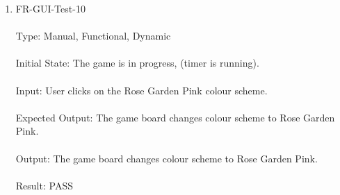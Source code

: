 \documentclass[12pt, titlepage]{article}
\begin{document}
\begin{enumerate}
\item{FR-GUI-Test-10\\\\}
Type: Manual, Functional, Dynamic\\\\				
Initial State: The game is in progress, (timer is running).\\\\
Input: User clicks on the Rose Garden Pink colour scheme.\\\\
Expected Output: The game board changes colour scheme to Rose Garden Pink.\\\\
Output: The game board changes colour scheme to Rose Garden Pink.\\\\
Result: PASS\\\\

\end{enumerate}

\newpage
\end{document}
